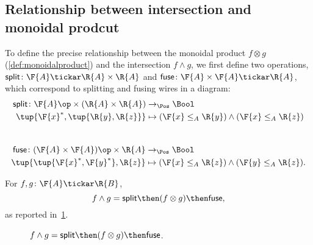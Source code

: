 \subsection{Relationship between intersection and monoidal prodcut}
To define the precise relationship between the monoidal product $f \otimes g$ (\cref{def:monoidalproduct}) and the intersection $f \wedge g$, we first define two operations, $\mathsf{split} \colon \F{A} \tickar \R{A} \times \R{A}$ and $\mathsf{fuse} \colon \F{A} \times \F{A} \tickar \R{A}$, which correspond to splitting and fusing wires in a diagram:
\begin{equation}
\begin{aligned}
    \mathsf{split} \colon \F{A}\op \times (\R{A} \times \R{A}) &\to_\Pos \Bool \\
    \tup{\F{x}^*, \tup{\R{y}, \R{z}}} &\mapsto (\F{x} \leq_A \R{y}) \wedge (\F{x} \leq_A \R{z})
\end{aligned}
\end{equation}
~
\begin{equation}
\begin{aligned}
    \mathsf{fuse} \colon (\F{A} \times \F{A})\op \times \R{A} &\to_\Pos \Bool \\
    \tup{ \tup{\F{x}^*, \F{y}^*}, \R{z}} &\mapsto (\F{x} \leq_A \R{z}) \wedge (\F{y} \leq_A \R{z}).
\end{aligned}
\end{equation}

\begin{lemma}
\label{lemma:intersection}
For $f,g \colon \F{A} \tickar \R{B}$,
\begin{equation}
f \wedge g = \mathsf{split} \then (f \otimes g) \then \mathsf{fuse},
\end{equation}
as reported in~\cref{fig:lemmasplitfuse}.
\begin{figure}[h!]
\begin{center}
\end{center}
\caption{$f \wedge g = \mathsf{split} \then (f \otimes g) \then \mathsf{fuse}$. \label{fig:lemmasplitfuse}}
\end{figure}
\end{lemma}


